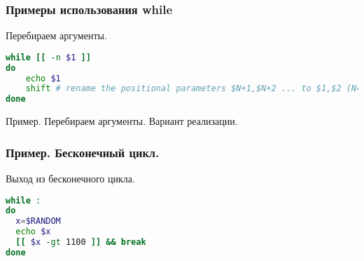 \begin{frame}[fragile]
\frametitle{Примеры использования while}

\begin{block}{Перебираем аргументы.}
\begin{lstlisting}[language=bash,frame=single]
while [[ -n $1 ]]
do
    echo $1
    shift # rename the positional parameters $N+1,$N+2 ... to $1,$2 (N=1)
done
\end{lstlisting}
\end{block}

\begin{block}{Пример. Перебираем аргументы. Вариант реализации.}

\end{block}
\end{frame}


\begin{frame}[fragile]
\frametitle{Пример. Бесконечный цикл.}
\begin{block}{Выход из бесконечного цикла.}
\begin{lstlisting}[language=bash,frame=single,name=random.sh]
while :
do
  x=$RANDOM
  echo $x
  [[ $x -gt 1100 ]] && break
done
\end{lstlisting}
\end{block}
\end{frame}
